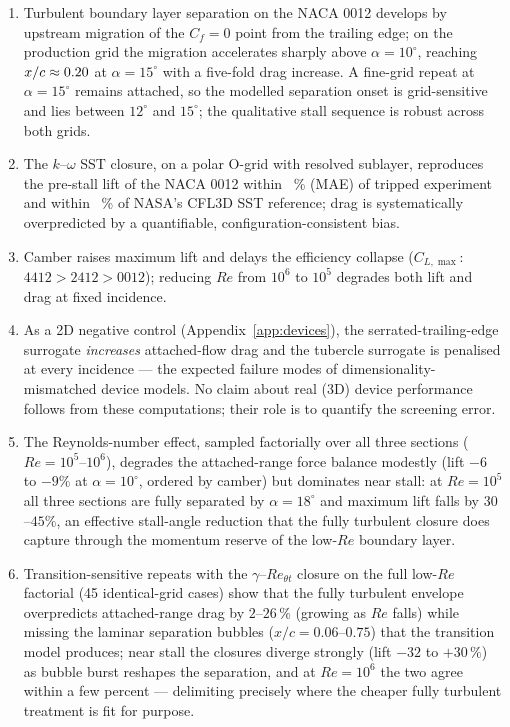 \documentclass[11pt,a4paper]{article}
\begin{document}
\begin{enumerate}
  \item Turbulent boundary layer separation on the NACA 0012 develops by upstream migration of the $C_f=0$ point from the trailing edge; on the production grid the migration accelerates sharply above $\alpha = 10^\circ$, reaching $x/c \approx 0.20$ at $\alpha = 15^\circ$ with a five-fold drag increase. A fine-grid repeat at $\alpha = 15^\circ$ remains attached, so the modelled separation onset is grid-sensitive and lies between $12^\circ$ and $15^\circ$; the qualitative stall sequence is robust across both grids.
  \item The $k$--$\omega$ SST closure, on a polar O-grid with resolved sublayer, reproduces the pre-stall lift of the NACA 0012 within \ClMAEpct{}~\% (MAE) of tripped experiment and within \CflThreeDClPct{}~\% of NASA's CFL3D SST reference; drag is systematically overpredicted by a quantifiable, configuration-consistent bias.
  \item Camber raises maximum lift and delays the efficiency collapse ($C_{L,\max}$: $4412 > 2412 > 0012$); reducing $Re$ from $10^6$ to $10^5$ degrades both lift and drag at fixed incidence.
  \item As a 2D negative control (Appendix~\ref{app:devices}), the serrated-trailing-edge surrogate \emph{increases} attached-flow drag and the tubercle surrogate is penalised at every incidence --- the expected failure modes of dimensionality-mismatched device models. No claim about real (3D) device performance follows from these computations; their role is to quantify the screening error.
  \item The Reynolds-number effect, sampled factorially over all three sections ($Re = 10^5$--$10^6$), degrades the attached-range force balance modestly (lift $-6$ to $-9\%$ at $\alpha = 10^\circ$, ordered by camber) but dominates near stall: at $Re = 10^5$ all three sections are fully separated by $\alpha = 18^\circ$ and maximum lift falls by $30$--$45\%$, an effective stall-angle reduction that the fully turbulent closure does capture through the momentum reserve of the low-$Re$ boundary layer.
  \item Transition-sensitive repeats with the $\gamma$--$Re_{\theta t}$ closure on the full low-$Re$ factorial (45 identical-grid cases) show that the fully turbulent envelope overpredicts attached-range drag by $2$--$26\,\%$ (growing as $Re$ falls) while missing the laminar separation bubbles ($x/c = 0.06$--$0.75$) that the transition model produces; near stall the closures diverge strongly (lift $-32$ to $+30\,\%$) as bubble burst reshapes the separation, and at $Re = 10^6$ the two agree within a few percent --- delimiting precisely where the cheaper fully turbulent treatment is fit for purpose.

\end{enumerate}
\end{document}
